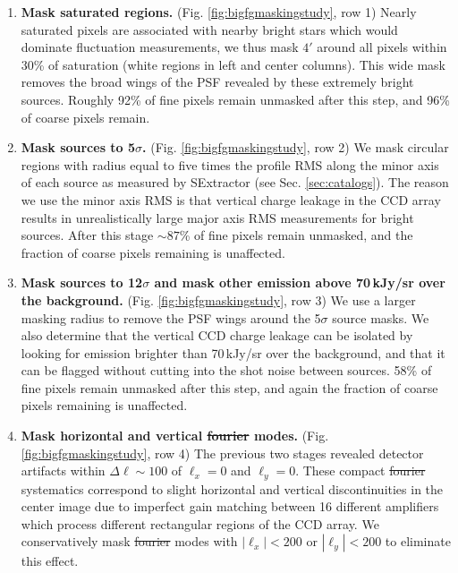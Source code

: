 \documentclass[numberedappendix]{emulateapj}
\providecommand{\DIFadd}[1]{{\protect\color{blue}\uwave{#1}}} %
\providecommand{\DIFdel}[1]{{\protect\color{red}\sout{#1}}}                      %
\providecommand{\DIFaddbegin}{} %
\providecommand{\DIFaddend}{} %
\providecommand{\DIFdelbegin}{} %
\providecommand{\DIFdelend}{} %
\begin{document}
\begin{enumerate}
	\item \textbf{Mask saturated regions.} (Fig. \ref{fig:bigfgmaskingstudy}, row 1) Nearly saturated pixels are associated with nearby bright stars which would dominate fluctuation measurements, we thus mask $4'$ around all pixels within 30\% of saturation (white regions in left and center columns). This wide mask removes the broad wings of the PSF revealed by these extremely bright sources. Roughly 92\% of fine pixels remain unmasked after this step, and 96\% of coarse pixels remain.
	\item \textbf{Mask sources to 5$\sigma$.} (Fig. \ref{fig:bigfgmaskingstudy}, row 2) We mask circular regions with radius equal to five times the profile RMS along the minor axis of each source as measured by SExtractor (see Sec. \ref{sec:catalogs}). The reason we use the minor axis RMS is that vertical charge leakage in the CCD array results in unrealistically large major axis RMS measurements for bright sources. After this stage $\sim87$\% of fine pixels remain unmasked, and the fraction of coarse pixels remaining is unaffected.
	\item \textbf{Mask sources to 12$\sigma$ and mask other emission above 70\,kJy/sr over the background.} (Fig. \ref{fig:bigfgmaskingstudy}, row 3) We use a larger masking radius to remove the PSF wings around the 5$\sigma$ source masks. We also determine that the vertical CCD charge leakage can be isolated by looking for emission brighter than 70\,kJy/sr over the background, and that it can be flagged without cutting into the shot noise between sources. 58\% of fine pixels remain unmasked after this step, and again the fraction of coarse pixels remaining is unaffected.
	\item \textbf{Mask horizontal and vertical \DIFdelbegin \DIFdel{fourier }\DIFdelend \DIFaddbegin \DIFadd{Fourier }\DIFaddend modes.} (Fig. \ref{fig:bigfgmaskingstudy}, row 4) The previous two stages revealed detector artifacts within $\Delta\ell \sim100$ of $\ell_x=0$ and $\ell_y=0$. These compact \DIFdelbegin \DIFdel{fourier }\DIFdelend \DIFaddbegin \DIFadd{Fourier }\DIFaddend systematics correspond to slight horizontal and vertical discontinuities in the center image due to imperfect gain matching between 16 different amplifiers which process different rectangular regions of the CCD array. We conservatively mask \DIFdelbegin \DIFdel{fourier }\DIFdelend \DIFaddbegin \DIFadd{Fourier }\DIFaddend modes with $|\ell_x|<200$ or $|\ell_y|<200$ to eliminate this effect.
\end{enumerate}
\end{document}
